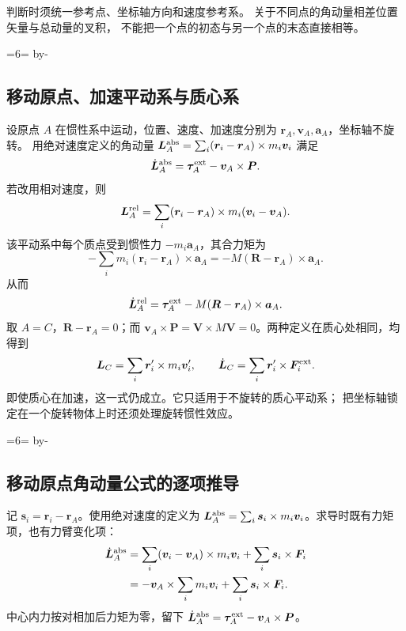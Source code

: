 \documentclass[UTF8,zihao=-4,fontset=fandol,a4paper]{ctexart}
\makeatletter
\newcommand{\vect}[1]{\bm{#1}}
\newcommand{\Needspace}[1]{\par\if@nobreak\else\penalty0\begingroup\dimen0=#1\relax\dimen2=\pagegoal\advance\dimen2 by-\pagetotal\ifdim\dimen0>\dimen2\newpage\fi\endgroup\fi}
\let\SavedSubsection\subsection
\renewcommand{\subsection}{\Needspace{6\baselineskip}\SavedSubsection}
\makeatother
\begin{document}
判断时须统一参考点、坐标轴方向和速度参考系。
关于不同点的角动量相差位置矢量与总动量的叉积，
不能把一个点的初态与另一个点的末态直接相等。

\subsection{移动原点、加速平动系与质心系}\label{sub:c2-3.2}
设原点 $A$ 在惯性系中运动，位置、速度、加速度分别为
$\vect r_A,\vect v_A,\vect a_A$，坐标轴不旋转。
用绝对速度定义的角动量
$\vect L_A^{\rm abs}=\sum_i(\vect r_i-\vect r_A)\times m_i\vect v_i$
满足
\begin{equation}
\dot{\vect L}_A^{\rm abs}
=\vect\tau_A^{\rm ext}-\vect v_A\times\vect P.
\end{equation}
若改用相对速度，则
\[
\vect L_A^{\rm rel}
=\sum_i(\vect r_i-\vect r_A)\times m_i(\vect v_i-\vect v_A).
\]
该平动系中每个质点受到惯性力 $-m_i\vect a_A$，其合力矩为
\[
-\sum_i m_i(\vect r_i-\vect r_A)\times\vect a_A
=-M(\vect R-\vect r_A)\times\vect a_A.
\]
从而
\begin{equation}
\dot{\vect L}_A^{\rm rel}
=\vect\tau_A^{\rm ext}-M(\vect R-\vect r_A)\times\vect a_A.
\end{equation}
取 $A=C$，$\vect R-\vect r_A=0$；而 $\vect v_A\times\vect P
=\vect V\times M\vect V=0$。两种定义在质心处相同，均得到
\begin{equation}\label{eq:LC}
\vect L_C=\sum_i\vect r'_i\times m_i\vect v'_i,\qquad
\dot{\vect L}_C=\sum_i\vect r'_i\times\vect F_i^{\rm ext}.
\end{equation}
即使质心在加速，这一式仍成立。它只适用于不旋转的质心平动系；
把坐标轴锁定在一个旋转物体上时还须处理旋转惯性效应。

\subsection{移动原点角动量公式的逐项推导}\label{sub:c2-3.3}\label{topic:movingorigindetail}
记 $\vect s_i=\vect r_i-\vect r_A$。使用绝对速度的定义为
$\vect L_A^{\rm abs}=\sum_i\vect s_i\times m_i\vect v_i$。求导时既有力矩项，也有力臂变化项：
\begin{align*}
\dot{\vect L}_A^{\rm abs}
&=\sum_i(\vect v_i-\vect v_A)\times m_i\vect v_i
+\sum_i\vect s_i\times\vect F_i\\
&=-\vect v_A\times\sum_i m_i\vect v_i
+\sum_i\vect s_i\times\vect F_i.
\end{align*}
中心内力按对相加后力矩为零，留下
$\dot{\vect L}_A^{\rm abs}=\vect\tau_A^{\rm ext}-\vect v_A\times\vect P$。
\end{document}
